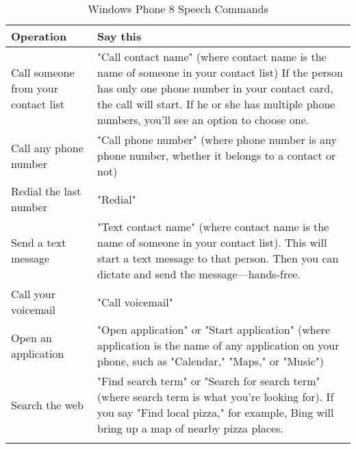 \begin{table}[htbp]
  \centering
  \caption{Windows Phone 8 Speech Commands}\label{tab:w8sc}
  \renewcommand{\arraystretch}{1.2}
    \begin{tabularx}{\textwidth}{XX}
    \toprule
    \textbf{Operation}  & \textbf{Say this} \\
    \midrule
    Call someone from your contact list & "Call contact name" 
           (where contact name is the name of someone in your contact list) 
           If the person has only one phone number in your contact card, the call will start. If he or she has multiple phone numbers, you'll see an option to choose one. \\ \hline
    Call any phone number & "Call phone number" (where phone number is any phone number, whether it belongs to a contact or not)\\ \hline
     Redial the last number & "Redial" \\ \hline
    Send a text message & "Text contact name" (where contact name is the name of someone in your contact list). This will start a text message to that person. Then you can dictate and send the message—hands-free. \\ \hline
    Call your voicemail & "Call voicemail" \\ \hline
    Open an application & "Open application" or "Start application" (where application is the name of any application on your phone, such as "Calendar," "Maps," or "Music") \\ \hline
    Search the web & "Find search term" or "Search for search term" (where search term is what you're looking for). If you say "Find local pizza," for example, Bing will bring up a map of nearby pizza places. \\
    \bottomrule
    \label{tab:w8sc2}
    \end{tabularx}
\end{table}%
